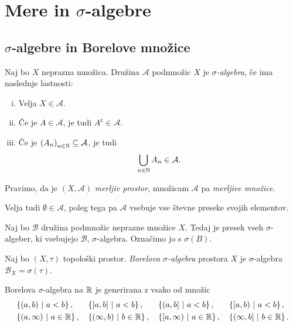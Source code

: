 \section{Mere in \texorpdfstring{$\sigma$}{sigma}-algebre}

\subsection{\texorpdfstring{$\sigma$}{Sigma}-algebre in Borelove množice}


\begin{definicija}
Naj bo $X$ neprazna množica. Družina $\mathcal{A}$ podmnožic $X$ je
\emph{$\sigma$-algebra}, če
ima naslednje lastnosti:

\begin{enumerate}[i)]
\item Velja $X \in \mathcal{A}$.
\item Če je $A \in \mathcal{A}$, je tudi
$A^{\mathsf{c}} \in \mathcal{A}$.
\item Če je $\left(A_n\right)_{n \in \mathbb{N}} \subseteq \mathcal{A}$, je tudi
\[
\bigcup_{n \in \mathbb{N}} A_n \in \mathcal{A}.
\]
\end{enumerate}

Pravimo, da je $(X, \mathcal{A})$
\emph{merljiv prostor}, množicam
$\mathcal{A}$ pa \emph{merljive množice}.
\end{definicija}

\begin{opomba}
Velja tudi $\emptyset \in \mathcal{A}$, poleg tega pa $\mathcal{A}$
vsebuje vse števne preseke svojih elementov.
\end{opomba}

\begin{trditev}
Naj bo $\mathcal{B}$ družina podmnožic neprazne množice $X$. Tedaj
je presek vseh $\sigma$-algeber, ki vsebujejo $\mathcal{B}$,
$\sigma$-algebra. Označimo jo s $\sigma(B)$.
\end{trditev}

\obvs

\begin{definicija}
Naj bo $(X, \tau)$ topološki prostor.
\emph{Borelova $\sigma$-algebra}
prostora $X$ je $\sigma$-algebra $\mathcal{B}_X = \sigma(\tau)$.
\end{definicija}

\begin{trditev}
Borelova $\sigma$-algebra na $\mathbb{R}$ je generirana z vsako od množic
\begin{align*}
&\left\{(a,b)~\middle\vert~a < b\right\}, &
&\left\{[a,b]~\middle\vert~a < b\right\}, &
&\left\{(a,b]~\middle\vert~a < b\right\}, &
&\left\{[a,b)~\middle\vert~a < b\right\}, \\
&\left\{(a,\infty)~\middle\vert~a \in \mathbb{R}\right\}, &
&\left\{(\infty,b)~\middle\vert~b \in \mathbb{R}\right\}, &
&\left\{[a,\infty)~\middle\vert~a \in \mathbb{R}\right\}, &
&\left\{(\infty,b]~\middle\vert~b \in \mathbb{R}\right\}.
\end{align*}
\end{trditev}


